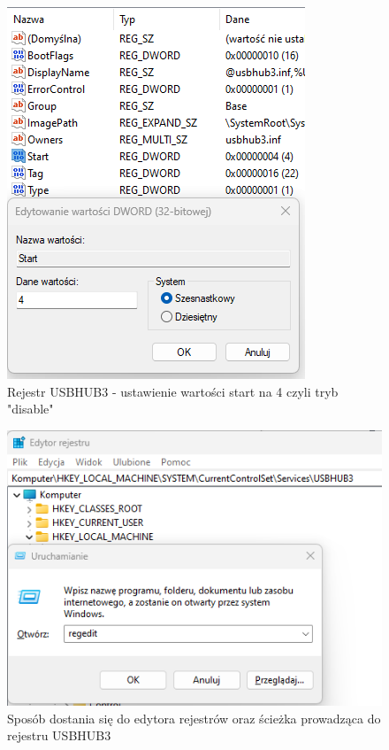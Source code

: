 \documentclass{article}
\begin{document}
\begin{figure}[h]
    \centering
    \includegraphics[scale=0.40]{Media/Rejestr.png}
    \caption{Rejestr USBHUB3 - ustawienie wartości start na 4 czyli tryb "disable"}
    \label{fig:enter-label}
    \end{figure}
    \begin{figure}[h]
    \centering
    \includegraphics[scale=0.45]{Media/Rejestr1.png}
    \caption{Sposób dostania się do edytora rejestrów oraz ścieżka prowadząca do rejestru USBHUB3}
    \label{fig:enter-label}
    \end{figure}    
\newpage
\end{document}
